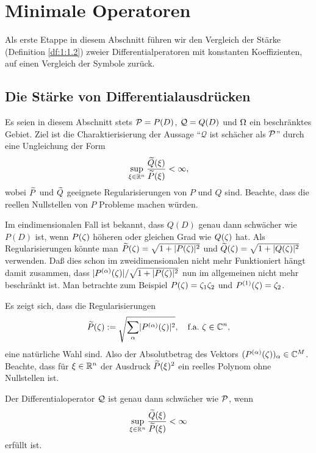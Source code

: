 \chapter{Minimale Operatoren}

Als erste Etappe in diesem Abschnitt führen wir den Vergleich der Stärke (Definition \ref{df:1:1.2})
zweier Differentialperatoren mit konstanten Koeffizienten,
auf einen Vergleich der Symbole zurück.

\section{Die Stärke von Differentialausdrücken}

Es seien in diesem Abschnitt stets $\mathcal P=P(D)$, $\mathcal Q=Q(D)$ und $\Omega$ ein beschränktes Gebiet.
Ziel ist die Charaktierisierung der Aussage ``$\mathcal Q$ ist schächer als $\mathcal P$''
durch eine Ungleichung der Form
\begin{equation}\label{eq:2:1}
\sup_{\xi\in\mathbb R^n}\frac{\widetilde{Q}(\xi)}{\widetilde{P}(\xi)}<\infty,
\end{equation}
wobei $\widetilde{P}$ und $\widetilde{Q}$ geeignete Regularisierungen von $P$ und $Q$ sind.
Beachte, dass die reellen Nullstellen von $P$ Probleme machen würden.

Im eindimensionalen Fall ist bekannt, dass $Q(D)$ genau dann schwächer wie $P(D)$ ist,
wenn $P(\zeta)$ höheren oder gleichen Grad wie $Q(\zeta)$ hat.
Als Regularisierungen könnte man $\widetilde{P}(\zeta)=\sqrt{1+\lvert P(\zeta)\rvert^2}$
und $\widetilde{Q}(\zeta)=\sqrt{1+\lvert Q(\zeta)\rvert^2}$ verwenden.
Daß dies schon im zweidimensionalen nicht mehr Funktioniert
hängt damit zusammen, dass $\lvert P^{(\alpha)}(\zeta)\rvert/\sqrt{1+\lvert P(\zeta)\rvert^2}$
nun im allgemeinen nicht mehr beschränkt ist.
Man betrachte zum Beispiel $P(\zeta)=\zeta_1\zeta_2$ und $P^{(1)}(\zeta)=\zeta_2$.

Es zeigt sich, dass die Regularisierungen
\begin{equation}\label{eq:2:2}
\widetilde{P}(\zeta):=\sqrt{\sum_\alpha\lvert P^{(\alpha)}(\zeta)\rvert^2},
\quad\text{f.a.}~\zeta\in\mathbb C^n,
\end{equation}
eine natürliche Wahl sind.
Also der Absolutbetrag des Vektors $(P^{(\alpha)}(\zeta))_\alpha\in\mathbb C^M$.
Beachte, dass für $\xi\in\mathbb R^n$ der Ausdruck
$\widetilde{P}(\xi)^2$ ein reelles Polynom ohne Nullstellen ist.

\begin{thm}\label{thm:2:2.1}
Der Differentialoperator $\mathcal Q$ ist genau dann schwächer wie $\mathcal P$,
wenn
\begin{equation}\label{eq:thm:2:2.1}
\sup_{\xi\in\mathbb R^n}\frac{\widetilde{Q}(\xi)}{\widetilde{P}(\xi)}<\infty
\end{equation}
erfüllt ist.
\end{thm}

